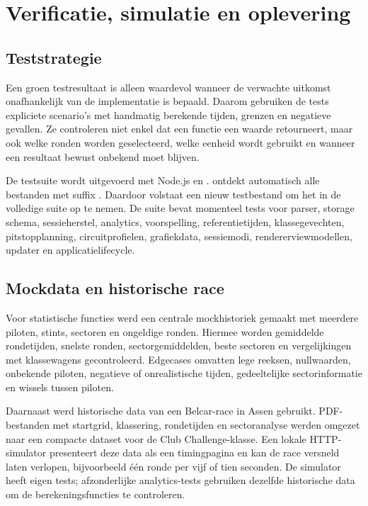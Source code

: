 \chapter{Verificatie, simulatie en oplevering}
\label{chap:testen}

\section{Teststrategie}
Een groen testresultaat is alleen waardevol wanneer de verwachte uitkomst onafhankelijk van de implementatie is bepaald. Daarom gebruiken de tests expliciete scenario's met handmatig berekende tijden, grenzen en negatieve gevallen. Ze controleren niet enkel dat een functie een waarde retourneert, maar ook welke ronden worden geselecteerd, welke eenheid wordt gebruikt en wanneer een resultaat bewust onbekend moet blijven.

De testsuite wordt uitgevoerd met Node.js en .  ontdekt automatisch alle bestanden met suffix . Daardoor volstaat een nieuw testbestand om het in de volledige suite op te nemen. De suite bevat momenteel tests voor parser, storage schema, sessieherstel, analytics, voorspelling, referentietijden, klassegevechten, pitstopplanning, circuitprofielen, grafiekdata, sessiemodi, rendererviewmodellen, updater en applicatielifecycle.

\section{Mockdata en historische race}
Voor statistische functies werd een centrale mockhistoriek gemaakt met meerdere piloten, stints, sectoren en ongeldige ronden. Hiermee worden gemiddelde rondetijden, snelste ronden, sectorgemiddelden, beste sectoren en vergelijkingen met klassewagens gecontroleerd. Edgecases omvatten lege reeksen, nullwaarden, onbekende piloten, negatieve of onrealistische tijden, gedeeltelijke sectorinformatie en wissels tussen piloten.

Daarnaast werd historische data van een Belcar-race in Assen gebruikt. PDF-bestanden met startgrid, klassering, rondetijden en sectoranalyse werden omgezet naar een compacte dataset voor de Club Challenge-klasse. Een lokale HTTP-simulator presenteert deze data als een timingpagina en kan de race versneld laten verlopen, bijvoorbeeld één ronde per vijf of tien seconden. De simulator heeft eigen tests; afzonderlijke analytics-tests gebruiken dezelfde historische data om de berekeningsfuncties te controleren.

